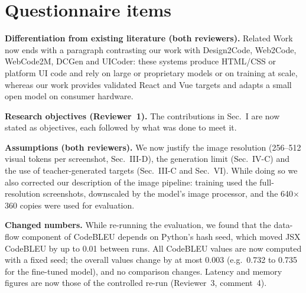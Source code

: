 \documentclass[11pt,a4paper]{article}
\begin{document}
\section*{Questionnaire items}

\textbf{Differentiation from existing literature (both reviewers).} Related Work
now ends with a paragraph contrasting our work with Design2Code, Web2Code,
WebCode2M, DCGen and UICoder: these systems produce HTML/CSS or platform UI code
and rely on large or proprietary models or on training at scale, whereas our work
provides validated React and Vue targets and adapts a small open model on consumer
hardware.

\textbf{Research objectives (Reviewer~1).} The contributions in Sec.~I are now
stated as objectives, each followed by what was done to meet it.

\textbf{Assumptions (both reviewers).} We now justify the image resolution
(256--512 visual tokens per screenshot, Sec.~III-D), the generation limit
(Sec.~IV-C) and the use of teacher-generated targets (Sec.~III-C and Sec.~VI).
While doing so we also corrected our description of the image pipeline: training
used the full-resolution screenshots, downscaled by the model's image processor,
and the 640$\times$360 copies were used for evaluation.

\textbf{Changed numbers.} While re-running the evaluation, we found that the
data-flow component of CodeBLEU depends on Python's hash seed, which moved JSX
CodeBLEU by up to 0.01 between runs. All CodeBLEU values are now computed with a
fixed seed; the overall values change by at most 0.003 (e.g.\ 0.732 to 0.735 for
the fine-tuned model), and no comparison changes. Latency and memory figures are
now those of the controlled re-run (Reviewer~3, comment~4).
\end{document}
